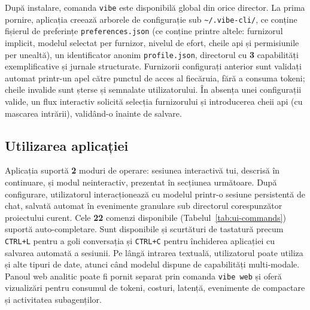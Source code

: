 \documentclass[12pt, a4paper, oneside, romanian]{teza-upb}
\begin{document}
    După instalare, comanda \texttt{vibe} este disponibilă global din orice director. La prima pornire, aplicația creează arborele de configurație sub \texttt{\textasciitilde/.vibe-cli/}, ce conține fișierul de preferințe \texttt{preferences.json} (ce conține printre altele: furnizorul implicit, modelul selectat per furnizor, nivelul de
    efort, cheile \ac{api} și permisiunile per unealtă), un identificator anonim \texttt{profile.json}, directorul cu \textbf{3} capabilități exemplificative și jurnale structurate. Furnizorii configurați anterior sunt validați automat printr-un apel către punctul de acces al fiecăruia, fără a consuma tokeni;
    cheile invalide sunt șterse și semnalate utilizatorului. În absența unei configurații valide, un flux interactiv solicită selecția furnizorului și introducerea cheii \ac{api} (cu mascarea intrării), validând-o înainte de salvare.

    \subsection{Utilizarea aplicației}

    Aplicația suportă \textbf{2} moduri de operare: sesiunea interactivă \ac{tui}, descrisă în continuare, și modul neinteractiv, prezentat în secțiunea următoare. După configurare, utilizatorul interacționează cu modelul printr-o sesiune persistentă de chat, salvată automat în evenimente granulare sub directorul corespunzător proiectului curent. Cele \textbf{22} comenzi disponibile (Tabelul~\ref{tab:ui-commands}) suportă auto-completare. Sunt disponibile și scurtături de tastatură precum \texttt{CTRL+L} pentru a goli conversația și \texttt{CTRL+C} pentru închiderea aplicației cu salvarea automată a sesiunii. Pe lângă intrarea textuală, utilizatorul poate utiliza și alte tipuri de date, atunci când modelul dispune de capabilități multi-modale. Panoul web analitic poate fi pornit separat prin comanda \texttt{vibe web} și oferă vizualizări pentru consumul de tokeni, costuri, latență, evenimente de compactare și activitatea subagenților.
  
\end{document}

